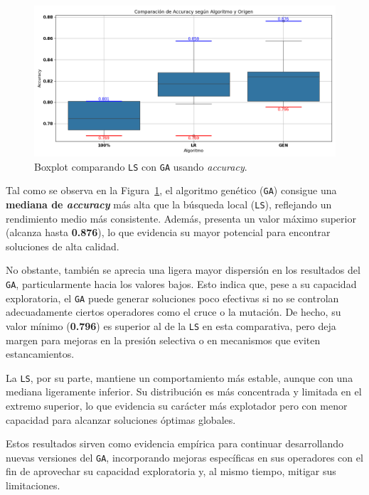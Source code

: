 \begin{figure}[htp]
    \centering
    \includegraphics[width=1\textwidth]{imagenes/evaluaciones/comparacion_lr-gen_v1}
    \caption{Boxplot comparando \texttt{LS} con \texttt{GA} usando \textit{accuracy}.}
    \label{fig:lr-vs-gen-v1}
\end{figure}

Tal como se observa en la Figura~\ref{fig:lr-vs-gen-v1}, el algoritmo genético (\texttt{GA}) consigue una \textbf{mediana de \textit{accuracy}} más alta que la búsqueda local (\texttt{LS}),
reflejando un rendimiento medio más consistente.
Además, presenta un valor máximo superior (alcanza hasta \textbf{0.876}), lo que evidencia su mayor potencial para encontrar soluciones de alta calidad.

No obstante, también se aprecia una ligera mayor dispersión en los resultados del \texttt{GA}, particularmente hacia los valores bajos.
Esto indica que, pese a su capacidad exploratoria, el \texttt{GA} puede generar soluciones poco efectivas si no se controlan adecuadamente ciertos operadores como el cruce o la mutación.
De hecho, su valor mínimo (\textbf{0.796}) es superior al de la \texttt{LS} en esta comparativa,
pero deja margen para mejoras en la presión selectiva o en mecanismos que eviten estancamientos.

La \texttt{LS}, por su parte, mantiene un comportamiento más estable, aunque con una mediana ligeramente inferior.
Su distribución es más concentrada y limitada en el extremo superior, lo que evidencia su carácter más explotador pero con menor capacidad para alcanzar soluciones óptimas globales.

Estos resultados sirven como evidencia empírica para continuar desarrollando nuevas versiones del \texttt{GA},
incorporando mejoras específicas en sus operadores con el fin de aprovechar su capacidad exploratoria y, al mismo tiempo, mitigar sus limitaciones.

